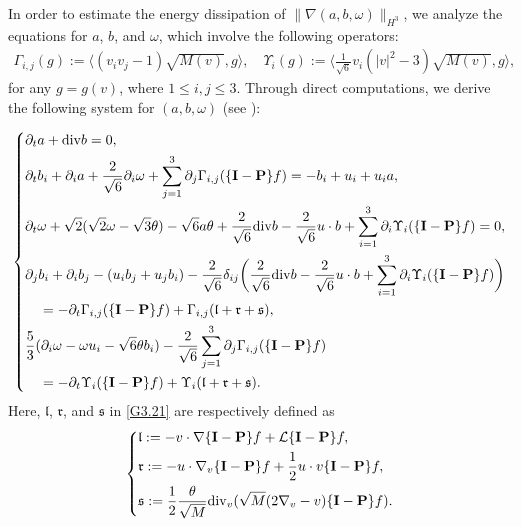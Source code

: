 \documentclass[reqno,11pt]{amsart}
\theoremstyle{plain}
\numberwithin{equation}{section}
\begin{document}
In order to estimate the energy dissipation of $ \|\nabla (a, b, \omega) \|_{H^3}$, we analyze the equations for $a$, $b$, and $\omega$, which involve the following operators:  
\begin{align*}  
\Gamma_{i, j}(g) := \big\langle (v_i v_j - 1) \sqrt{M(v)}, g \big\rangle, \quad \Upsilon_i (g) := \Big\langle \frac{1}{\sqrt{6}} v_i (|v|^2 - 3) \sqrt{M(v)}, g \Big\rangle,  
\end{align*}  
for any $g = g(v)$, where $1 \leq i, j \leq 3$. Through direct computations, we derive the following system for $(a, b, \omega)$ (see \cite{LNW-arXiv-2025,Mu-Wang-20}):

\begin{equation}\label{G3.21}
\left\{\begin{aligned}
&\partial_t a+{\rm div} b=0,\\
& \partial_t b_i+\partial_i a+\frac{2}{\sqrt{6}} \partial_i \omega+\sum_{j=1}^3 \partial_{j} \Gamma_{i, j}(\{\mathbf{I}-\mathbf{P}\} f)=-b_i+u_i+u_i a, \\
& \partial_t \omega+\sqrt{2}(\sqrt{2} \omega-\sqrt{3} \theta)-\sqrt{6} a \theta+\frac{2}{\sqrt{6}} {\rm div}  b-\frac{2}{\sqrt{6}} u \cdot b    +\sum_{i=1}^3 \partial_{i} \Upsilon_i(\{\mathbf{I}-\mathbf{P}\} f)=0, \\
& \partial_j b_i+\partial_i b_j- (u_i b_j+u_j b_i )  -\frac{2}{\sqrt{6}} \delta_{i j}\bigg(\frac{2}{\sqrt{6}} {\rm div}   b-\frac{2}{\sqrt{6}} u \cdot b+\sum_{i=1}^3 \partial_{ i} \Upsilon_i(\{\mathbf{I}-\mathbf{P}\} f)\bigg) \\
&\quad =-\partial_t \Gamma_{i, j}(\{\mathbf{I}-\mathbf{P}\} f)+\Gamma_{i, j}(\mathfrak{l}+\mathfrak{r}+\mathfrak{s}), \\
& \frac{5}{3} (\partial_i \omega-\omega u_i-\sqrt{6} \theta b_i )-\frac{2}{\sqrt{6}} \sum_{j=1}^3 \partial_{j} \Gamma_{i, j}(\{\mathbf{I}-\mathbf{P}\} f)   \\
&\quad=-\partial_t \Upsilon_i(\{\mathbf{I}-\mathbf{P}\} f)+\Upsilon_i(\mathfrak{l}+\mathfrak{r}+\mathfrak{s}).
\end{aligned}\right.
\end{equation}
Here, $\mathfrak{l}$, $\mathfrak{r}$, and $\mathfrak{s}$ in \eqref{G3.21} are respectively defined as  
\begin{equation}\label{G3.22}
\left\{\begin{aligned}
& \mathfrak{l}:=-v \cdot \nabla\{\mathbf{I}-\mathbf{P}\} f+\mathcal{L}\{\mathbf{I}-\mathbf{P}\} f,  \\
& \mathfrak{r}:=-u \cdot \nabla_v\{\mathbf{I}-\mathbf{P}\} f+\frac{1}{2} u \cdot v\{\mathbf{I}-\mathbf{P}\} f,  \\
& \mathfrak{s}:=\frac{1}{2}\frac{\theta}{\sqrt{M}} {\rm div}_v(\sqrt{M} (2\nabla_v-v)\{\mathbf{I}-\mathbf{P}\} f) . 
\end{aligned}\right.
\end{equation}
\end{document}
